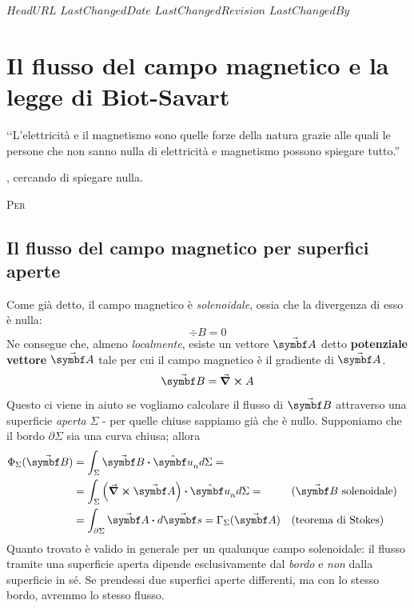 \svnidlong
{$HeadURL$}
{$LastChangedDate$}
{$LastChangedRevision$}
{$LastChangedBy$}

\chapter{Il flusso del campo magnetico e la legge di Biot-Savart}

\begin{introduction}
	‘‘L’elettricità e il magnetismo sono quelle forze della natura grazie alle quali le persone che non sanno nulla di elettricità e magnetismo possono spiegare tutto.''
	\begin{flushright}
		, cercando di spiegare nulla.
	\end{flushright}
\end{introduction}
\lettrine[findent=1pt, nindent=0pt]{P}{er}  %

\section{Il flusso del campo magnetico per superfici aperte}
Come già detto, il campo magnetico è \textit{solenoidale}, ossia che la divergenza di esso è nulla:
\begin{equation*}
	\div{B}=0
\end{equation*}
Ne consegue che, almeno \textit{localmente}, esiste un vettore $\vba{A}$ detto \textbf{potenziale vettore} $\vba{A}$ tale per cui il campo magnetico è il gradiente di $\vba{A}$.
\begin{equation}
	\vba{B}=\curl{A}
\end{equation}
Questo ci viene in aiuto se vogliamo calcolare il flusso di $\vba{B}$ attraverso una superficie \textit{aperta} $\Sigma$ - per quelle chiuse sappiamo già che è nullo. Supponiamo che il bordo $\partial \Sigma$ sia una curva chiusa; allora
\begin{align*}
	\Phi_{\Sigma}(\vba{B})&=\int_{\Sigma}\vba{B}\vdot\vbh{u}_nd\Sigma=\\
	&=\int_{\Sigma}\left(\curl{\vba{A}}\right)\vdot\vbh{u}_nd\Sigma=&&\text{(}\vba{B}\ \text{solenoidale)}\\
	&=\int_{\partial \Sigma}\vba{A}\vdot d\vba{s}=\Gamma_{\Sigma}(\vba{A})&&\text{(teorema di Stokes)}
\end{align*}
Quanto trovato è valido in generale per un qualunque campo solenoidale: il flusso tramite una superficie aperta dipende esclusivamente dal \textit{bordo} e \textit{non} dalla superficie in sé. Se prendessi due superfici aperte differenti, ma con lo stesso bordo, avremmo lo stesso flusso.

